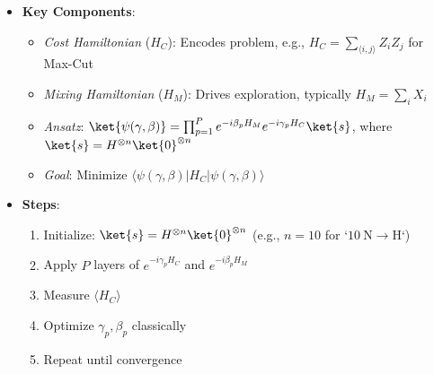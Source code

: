 \begin{multicols}{3}
\begin{itemize}[leftmargin=*,nosep,topsep=0pt]
                    \item \textbf{Key Components}:
                      \begin{itemize}[nosep]
                        \item \textit{Cost Hamiltonian} ($H_C$): Encodes
                          problem, e.g., $H_C = \sum_{\langle i,j \rangle}
                          Z_i Z_j$ for Max-Cut

                        \item \textit{Mixing Hamiltonian} ($H_M$): Drives
                          exploration, typically $H_M = \sum_i X_i$

                        \item \textit{Ansatz}: $\ket{\psi(\gamma, \beta)} =
                          \prod_{p=1}^P e^{-i\beta_p H_M} e^{-i\gamma_p H_C}
                          \ket{s}$, where $\ket{s} = H^{\otimes n}
                          \ket{0}^{\otimes n}$

                        \item \textit{Goal}: Minimize $\langle \psi(\gamma,
                          \beta) | H_C | \psi(\gamma, \beta) \rangle$
                      \end{itemize}

                    \item \textbf{Steps}:
                      \begin{enumerate}[nosep]
                        \item Initialize: $\ket{s} = H^{\otimes n}
                          \ket{0}^{\otimes n}$ (e.g., $n=10$ for `$10
                          \mathrm{~N} \rightarrow \mathrm{H}$`)

                        \item Apply $P$ layers of $e^{-i\gamma_p H_C}$ and
                          $e^{-i\beta_p H_M}$

                        \item Measure $\langle H_C \rangle$

                        \item Optimize $\gamma_p, \beta_p$ classically

                        \item Repeat until convergence
                      \end{enumerate}


\end{itemize}
\end{multicols}

